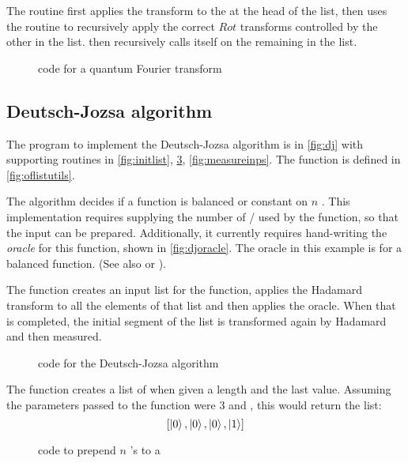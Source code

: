 The routine  first applies the \Had{} transform to the
\qubit{} at the head of the list, then uses the  routine
to recursively apply the correct $Rot$ transforms controlled by the
other \qubits{} in the list.  then recursively calls itself on
the remaining \qubits{} in the list.

\begin{figure}[htbp]

\caption{\lqpl{} code for a quantum Fourier transform}\label{fig:qft}
\end{figure}

\subsection{Deutsch-Jozsa algorithm}\label{appsubsec:djalgorithm}
The \lqpl{} program to implement the Deutsch-Jozsa algorithm is in 
\vref{fig:dj} with supporting routines in \ref{fig:initlist}, 
\ref{fig:addnzerps}, \ref{fig:measureinps}. The 
 function is defined in \vref{fig:oflistutils}.

The algorithm decides if a function is balanced or constant on 
$n$ \bits. This implementation requires supplying the number of
\bits{} / \qubits{} used by the function, so that the input can 
be prepared. Additionally, it currently requires hand-writing the 
\emph{oracle} for this function, shown in \ref{fig:djoracle}. The 
oracle in this example is for a balanced function. 
(See also \cite{watrous:lecnotes} or
\cite{neilsen2000:QuantumComputationAndInfo}).

The function  creates an input list for the function, 
applies the Hadamard transform to all the elements of that list
and  then applies the oracle. When that is completed, the initial segment
of the list is transformed again by Hadamard and then measured. 


\begin{figure}[htbp]

\caption{\lqpl{} code for the Deutsch-Jozsa algorithm}\label{fig:dj}
\end{figure}

The function  creates a list of \qubits{} when given
a length and the last value. Assuming the parameters passed to the 
function were $3$ and , this would return the list:
\[[\left\vert{0}\right\rangle,\left\vert{0}\right\rangle,\left\vert{0}\right\rangle,\left\vert{1}\right\rangle]\]
\begin{figure}[htbp]

\caption{\lqpl{} code to prepend $n$ 's to a \qubit}\label{fig:addnzerps}
\end{figure}

